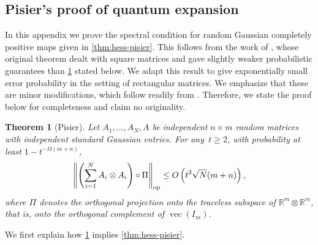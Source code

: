 \documentclass[aos]{imsart}
\newtheorem{theorem}{Theorem}[section]
\theoremstyle{definition}
\numberwithin{equation}{section}
\DeclareMathOperator{\op}{op}
\DeclareMathOperator{\vect}{vec}
\DeclarePairedDelimiter{\norm}{\lVert}{\rVert}
\newcommand{\R}{{\mathbb{R}}}
\newcommand{\ot}{\otimes}
\begin{document}
\begin{appendix}

\section{Pisier's proof of quantum expansion}\label{sec:pisier}
In this appendix we prove the spectral condition for random Gaussian completely positive maps given in \cref{thm:hess-pisier}.
This follows from the work of \cite{pisier2012grothendieck}, whose original theorem dealt with square matrices and gave slightly weaker probabilistic guarantees than \cref{thm:Pisier-expansion} stated below.
We adapt this result to give exponentially small error probability in the setting of rectangular matrices.
We emphasize that these are minor modifications, which follow readily from \cite{P14,pisier2012grothendieck}.
Therefore, we state the proof below for completeness and claim no originality.

\begin{theorem}[Pisier]\label{thm:Pisier-expansion}
Let $A_1,\dots,A_N,A$ be independent $n \times m$ random matrices with independent standard Gaussian entries.
For any~$t \geq 2$, with probability at least $1 - t^{-\Omega(m+n)}$,
\begin{align*}
  \norm*{\left(\sum_{i=1}^N A_i \otimes A_i \right) \circ \Pi}_{\op}
  \leq O\left( t^2 \sqrt{N} ( m+n ) \right),
\end{align*}
where $\Pi$ denotes the orthogonal projection onto the traceless subspace of $\R^m \ot \R^m$, that is, onto the orthogonal complement of $\vect(I_m)$.
\end{theorem}

We first explain how \cref{thm:Pisier-expansion} implies \cref{thm:hess-pisier}.


\end{appendix}
\end{document}
